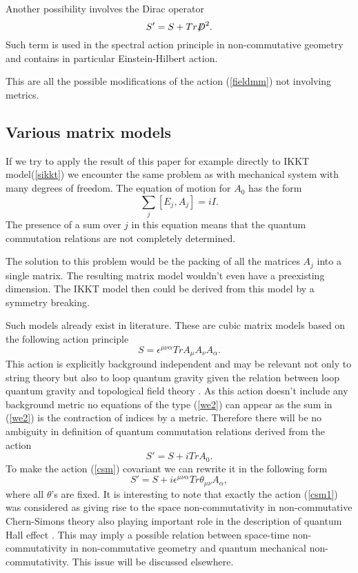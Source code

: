 \documentclass[a4paper,11pt]{article}
\begin{document}
Another possibility involves the Dirac operator
\begin{equation}
S'=S+Tr\mathord{\not\mathrel{D}}^2. \label{sp}
\end{equation}
Such term is used in the spectral action principle in
non-commutative geometry \cite{spacpr,connes} and contains in
particular Einstein-Hilbert action.

This are all the possible modifications of the action
(\ref{fieldmm}) not involving metrics.

\subsection*{Various matrix models}
If we try to apply the result of this paper for example directly
to IKKT model(\ref{sikkt}) we encounter the same problem as with
mechanical system with many degrees of freedom. The equation of
motion for $A_0$ has the form
\begin{equation}
\sum\limits_j [E_j,A_j] = iI. \label{we2}
\end{equation}
The presence of a sum over $j$ in this equation means that the
quantum commutation relations are not completely determined.

The solution to this problem would be the packing of all the
matrices $A_j$ into a single matrix. The resulting matrix model
wouldn't even have a preexisting dimension. The IKKT model then
could be derived from this model by a symmetry breaking.

Such models already exist in literature. These are cubic matrix
models \cite{cmm} based on the following action principle
\begin{equation}
S=\epsilon^{\mu \nu \alpha} Tr A_\mu A_\nu A_\alpha.
\end{equation}
This action is explicitly background independent and may be
relevant not only to string theory but also to loop quantum
gravity given the relation between loop quantum gravity and
topological field theory \cite{llt}. As this action doesn't
include any background metric no equations of the type (\ref{we2})
can appear as the sum in (\ref{we2}) is the contraction of indices
by a metric. Therefore there will be no ambiguity in definition of
quantum commutation relations derived from the action
\begin{equation}
S'=S+iTrA_0. \label{csm}
\end{equation}
To make the action (\ref{csm}) covariant we can rewrite it in the
following form
\begin{equation}
S'=S+i\epsilon^{\mu \nu \alpha}Tr\theta_{\mu \nu}A_\alpha,
\label{csm1}
\end{equation}
where all $\theta$'s are fixed. It is interesting to note that
exactly the action (\ref{csm1}) was considered as giving rise to
the space non-commutativity in non-commutative Chern-Simons theory
also playing important role in the description of quantum Hall
effect \cite{noncomcs}. This may imply a possible relation between
space-time non-commutativity in non-commutative geometry and
quantum mechanical non-commutativity. This issue will be discussed
elsewhere.
\end{document}

